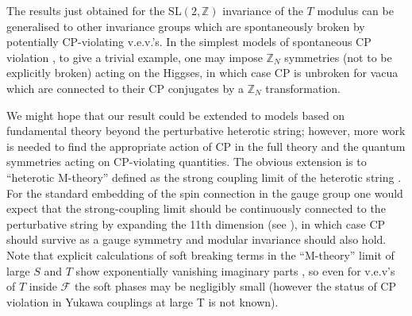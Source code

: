 \documentclass[a4paper,12pt]{article}
\begin{document}
The results just obtained for the SL$(2,\mathbb{Z})$ invariance of the $T$ modulus can be generalised to other invariance groups which are spontaneously broken by potentially CP-violating v.e.v.'s. In the simplest models of spontaneous CP violation \cite{Lee_Weinberg}, to give a trivial example, one may impose $\mathbb{Z}_N$ symmetries (not to be explicitly broken) acting on the Higgses, in which case CP is unbroken for vacua which are connected to their CP conjugates by a $\mathbb{Z}_N$ transformation.

We might hope that our result could be extended to models based on fundamental theory beyond the perturbative heterotic string; however, more work is needed to find the appropriate action of CP in the full theory and the quantum symmetries acting on CP-violating quantities. The obvious extension is to ``heterotic M-theory'' defined as the strong coupling limit of the heterotic string \cite{Horava_Witten}. For the standard embedding of the spin connection in the gauge group one would expect that the strong-coupling limit should be continuously connected to the perturbative string by expanding the 11th dimension (see \cite{NillesS97}), in which case CP should survive as a gauge symmetry and modular invariance should also hold. Note that explicit calculations of soft breaking terms in the ``M-theory'' limit of large $S$ and $T$ show exponentially vanishing imaginary parts \cite{BailinKL2000}, so even for v.e.v's of $T$ inside $\mathcal{F}$ the soft phases may be negligibly small (however the status of CP violation in Yukawa couplings at large T is not known).
\end{document}
